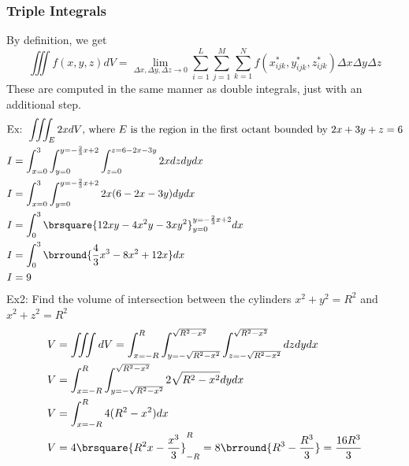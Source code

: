 \subsubsection{Triple Integrals}
By definition, we get
$$\iiint f(x,y,z)dV=\lim_{\Delta x,\Delta y,\Delta z\to0}\sum_{i=1}^L\sum_{j=1}^M\sum_{k=1}^Nf(x_{ijk}^*,y_{ijk}^*,z_{ijk}^*)\Delta x\Delta y\Delta z$$
These are computed in the same manner as double integrals, just with an additional step.\\
\begin{align*}
    &\text{Ex: }\iiint_E 2xdV\text{, where $E$ is the region in the first octant bounded by }2x+3y+z=6\\
    &I=\int_{x=0}^3\int_{y=0}^{y=-\frac{2}{3}x+2}\int_{z=0}^{z=6-2x-3y}2xdzdydx\\
    &I=\int_{x=0}^3\int_{y=0}^{y=-\frac{2}{3}x+2}2x(6-2x-3y)dydx\\
    &I=\int_0^3\brsquare{12xy-4x^2y-3xy^2}_{y=0}^{y=-\frac{2}{3}x+2}dx\\
    &I=\int_0^3\brround{\frac{4}{3}x^3-8x^2+12x}dx\\
    &I=9
\end{align*}
Ex2: Find the volume of intersection between the cylinders $x^2+y^2=R^2$ and $x^2+z^2=R^2$
\begin{align*}
    &V=\iiint dV=\int_{x=-R}^R\int_{y=-\sqrt{R^2-x^2}}^{\sqrt{R^2-x^2}}\int_{z=-\sqrt{R^2-x^2}}^{\sqrt{R^2-x^2}}dzdydx\\
    &V=\int_{x=-R}^R\int_{y=-\sqrt{R^2-x^2}}^{\sqrt{R^2-x^2}}2\sqrt{R^2-x^2}dydx\\
    &V=\int_{x=-R}^R4(R^2-x^2)dx\\
    &V=4\brsquare{R^2x-\frac{x^3}{3}}_{-R}^R=8\brround{R^3-\frac{R^3}{3}}=\frac{16R^3}{3}
\end{align*}
